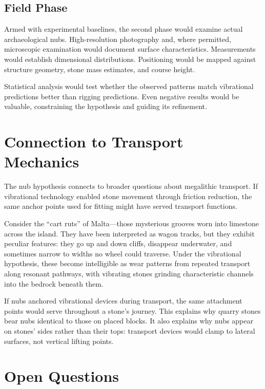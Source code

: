 \documentclass[11pt]{article}
\begin{document}
\subsection{Field Phase}

Armed with experimental baselines, the second phase would examine actual archaeological nubs. High-resolution photography and, where permitted, microscopic examination would document surface characteristics. Measurements would establish dimensional distributions. Positioning would be mapped against structure geometry, stone mass estimates, and course height.

Statistical analysis would test whether the observed patterns match vibrational predictions better than rigging predictions. Even negative results would be valuable, constraining the hypothesis and guiding its refinement.

\section{Connection to Transport Mechanics}

The nub hypothesis connects to broader questions about megalithic transport. If vibrational technology enabled stone movement through friction reduction, the same anchor points used for fitting might have served transport functions.

Consider the ``cart ruts'' of Malta—those mysterious grooves worn into limestone across the island. They have been interpreted as wagon tracks, but they exhibit peculiar features: they go up and down cliffs, disappear underwater, and sometimes narrow to widths no wheel could traverse. Under the vibrational hypothesis, these become intelligible as wear patterns from repeated transport along resonant pathways, with vibrating stones grinding characteristic channels into the bedrock beneath them.

If nubs anchored vibrational devices during transport, the same attachment points would serve throughout a stone's journey. This explains why quarry stones bear nubs identical to those on placed blocks. It also explains why nubs appear on stones' sides rather than their tops: transport devices would clamp to lateral surfaces, not vertical lifting points.

\section{Open Questions}
\end{document}
